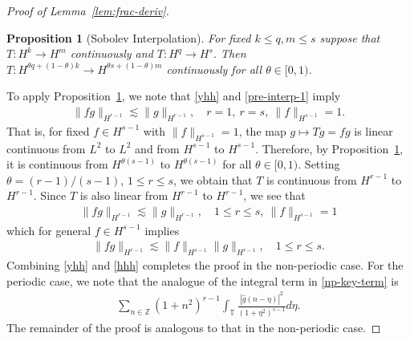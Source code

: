 \documentclass[12pt,reqno]{amsart}
\numberwithin{equation}{section}  %
\numberwithin{figure}{section}
\newcommand{\zz}{\mathbb{Z}}
\newcommand{\ci}{\mathbb{T}}
\newcommand{\wh}{\widehat}
\newtheorem{proposition}[theorem]{Proposition}
\begin{document}
\begin{proof}[Proof of Lemma~\ref{lem:frac-deriv}]
%
%
%
%                
%
%
%
%
\begin{proposition}[Sobolev Interpolation]
  For fixed $k \le q, m \le s$ suppose that \\ $T: H^{k} \to H^{m}$ continuously
and $T: H^{q} \to H^{s}$. Then\\ $T: H^{\theta q + (1 - \theta)k} \to H^{\theta
s + (1 - \theta) m}$ continuously for all $\theta \in [0,1)$.
\label{prop:sob-interp}
\end{proposition}
%
To apply Proposition~\ref{prop:sob-interp}, we note that \eqref{yhh}
and \eqref{pre-interp-1} imply
%
%
\begin{equation*}
\begin{split}
  \| f g \|_{H^{r-1}} \lesssim \| g \|_{H^{r-1}}, \quad
  r=1, \  r =s, \ \| f \|_{H^{s-1}} =1.
\end{split}
\end{equation*}
%
%
That is, for fixed $f \in H^{s-1}$ with $\| f \|_{H^{s-1}} =1$, the map $g \mapsto
Tg = fg$ is linear continuous from $L^{2}$ to $L^{2}$ and from $H^{s-1}$ to
$H^{s-1}$. Therefore, by Proposition~\ref{prop:sob-interp}, it is continuous from
$H^{\theta (s-1) }$ to $H^{\theta (s-1)}$ for all $\theta \in
[0, 1)$. Setting $\theta = (r-1)/(s-1)$, $ 1 \le r \le s$, we obtain that $T$ is
continuous from $H^{r-1}$ to $H^{r-1}$. Since $T$ is also linear from $H^{r-1}$
to $H^{r-1}$, we see that 
%
%
\begin{equation*}
\begin{split}
  \| f g \|_{H^{r-1}} \lesssim \| g \|_{H^{r-1}}, \quad 1 \le r \le s, \
  \| f \|_{H^{s-1}} =1
\end{split}
\end{equation*}
which for general $f \in H^{s-1}$ implies 
%
\begin{equation}
  \label{hhh}
\begin{split}
  \| f g \|_{H^{r-1}} \lesssim \|f \|_{H^{s-1}}
  \| g \|_{H^{r-1}}, \quad 1 \le r \le s. 
\end{split}
\end{equation}
%
Combining \eqref{yhh} and \eqref{hhh} completes the proof in the non-periodic
case. For the periodic case, we note that the analogue of the integral term in \eqref{np-key-term} is
%
%
%
\begin{equation*}
\begin{split}
  \sum_{n \in \zz}   (1 + n^{2})^{r-1}\int_{\ci} \frac{| \wh{g}(n - \eta)
  |^{2}}{(1 + \eta^{2})^{s-1}} d \eta. 
\end{split}
\end{equation*}
%
%
The remainder of the proof is analogous to that in the non-periodic case.
\end{proof}
\end{document}
